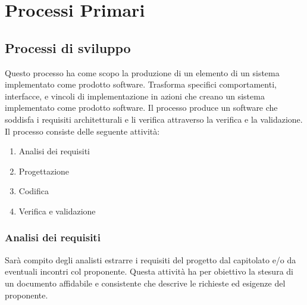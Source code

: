 \documentclass[a4paper,11pt]{article}
\begin{document}
	\newpage
	\section{Processi Primari}
		\subsection{Processi di sviluppo}	
		Questo processo ha come scopo la produzione di un elemento di un sistema implementato come prodotto software. Trasforma specifici comportamenti, interfacce, e vincoli di implementazione in azioni che creano un sistema implementato come prodotto software. Il processo produce un software che soddisfa i requisiti architetturali e li verifica attraverso la	verifica e la validazione.	
		Il processo consiste delle seguente attività:
			\begin{enumerate}
				\item Analisi dei requisiti
				\item Progettazione
				\item Codifica
				\item Verifica e validazione
			\end{enumerate}
		\subsubsection{Analisi dei requisiti}
		Sarà compito degli analisti estrarre i requisiti del progetto dal capitolato e/o da eventuali incontri col proponente. Questa attività ha per obiettivo la stesura di un documento affidabile e consistente che descrive le richieste ed esigenze del proponente.
\end{document}
